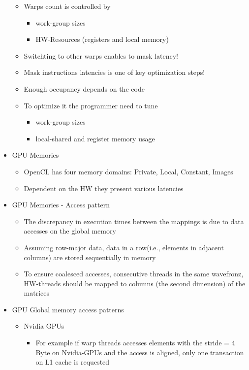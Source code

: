 \documentclass[paper=a4, fontsize=11pt]{scrartcl} %
\numberwithin{equation}{section} %
\numberwithin{figure}{section} %
\numberwithin{table}{section} %
\begin{document}
\begin{itemize}
\begin{itemize}
    \item Warps count is controlled by
    \begin{itemize}
      \item work-group sizes
      \item HW-Resources (registers and local memory)
    \end{itemize}
    \item Switchting to other warps enables to mask latency!
    \item Mask instructions latencies is one of key optimization steps!
    \item Enough occupancy depends on the code
    \item To optimize it the programmer need to tune
    \begin{itemize}
      \item work-group sizes
      \item local-shared and register memory usage
    \end{itemize}
  \end{itemize}
  \item GPU Memories
  \begin{itemize}
    \item OpenCL has four memory domains: Private, Local, Constant, Images
    \item Dependent on the HW they present various latencies
  \end{itemize}
  \item GPU Memories - Access pattern
  \begin{itemize}
    \item The discrepancy in execution times between the mappings is due to data accesses on the global memory
    \item Assuming row-major data, data in a row(i.e., elements in adjacent columns) are stored sequentially in memory
    \item To ensure coalesced accesses, consecutive threads in the same wavefronz, HW-threads should be mapped to columns (the second dimension) of the matrices
  \end{itemize}
  \item GPU Global memory access patterns
  \begin{itemize}
    \item Nvidia GPUs
    \begin{itemize}
      \item For example if warp threads accesses elements with the stride = 4 Byte on Nvidia-GPUs and the access is aligned, only one transaction on L1 cache is requested

\end{itemize}
\end{itemize}
\end{itemize}
\end{document}
